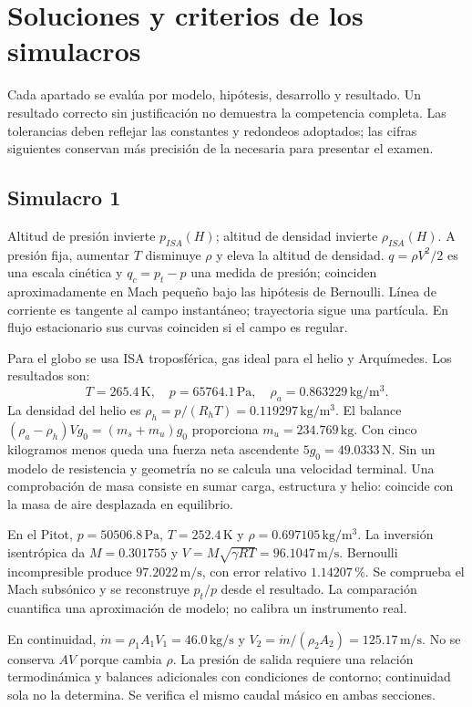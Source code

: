 \chapter{Soluciones y criterios de los simulacros}
Cada apartado se evalúa por modelo, hipótesis, desarrollo y resultado. Un resultado correcto sin justificación no demuestra la competencia completa. Las tolerancias deben reflejar las constantes y redondeos adoptados; las cifras siguientes conservan más precisión de la necesaria para presentar el examen.
\section{Simulacro 1}
Altitud de presión invierte $p_{ISA}(H)$; altitud de densidad invierte $\rho_{ISA}(H)$. A presión fija, aumentar $T$ disminuye $\rho$ y eleva la altitud de densidad. $q=\rho V^2/2$ es una escala cinética y $q_c=p_t-p$ una medida de presión; coinciden aproximadamente en Mach pequeño bajo las hipótesis de Bernoulli. Línea de corriente es tangente al campo instantáneo; trayectoria sigue una partícula. En flujo estacionario sus curvas coinciden si el campo es regular.

Para el globo se usa ISA troposférica, gas ideal para el helio y Arquímedes. Los resultados son:
\[T=265.4\,\mathrm K,\quad p=65764.1\,\mathrm{Pa},\quad \rho_a=0.863229\,\mathrm{kg/m^3}.\]
La densidad del helio es $\rho_h=p/(R_hT)=0.119297\,\mathrm{kg/m^3}$. El balance $(\rho_a-\rho_h)Vg_0=(m_s+m_u)g_0$ proporciona $m_u=234.769\,\mathrm{kg}$. Con cinco kilogramos menos queda una fuerza neta ascendente $5g_0=49.0333\,\mathrm N$. Sin un modelo de resistencia y geometría no se calcula una velocidad terminal. Una comprobación de masa consiste en sumar carga, estructura y helio: coincide con la masa de aire desplazada en equilibrio.

En el Pitot, $p=50506.8\,\mathrm{Pa}$, $T=252.4\,\mathrm K$ y $\rho=0.697105\,\mathrm{kg/m^3}$. La inversión isentrópica da $M=0.301755$ y $V=M\sqrt{\gamma RT}=96.1047\,\mathrm{m/s}$. Bernoulli incompresible produce $97.2022\,\mathrm{m/s}$, con error relativo $1.14207\,\%$. Se comprueba el Mach subsónico y se reconstruye $p_t/p$ desde el resultado. La comparación cuantifica una aproximación de modelo; no calibra un instrumento real.

En continuidad, $\dot m=\rho_1A_1V_1=46.0\,\mathrm{kg/s}$ y $V_2=\dot m/(\rho_2A_2)=125.17\,\mathrm{m/s}$. No se conserva $AV$ porque cambia $\rho$. La presión de salida requiere una relación termodinámica y balances adicionales con condiciones de contorno; continuidad sola no la determina. Se verifica el mismo caudal másico en ambas secciones.
